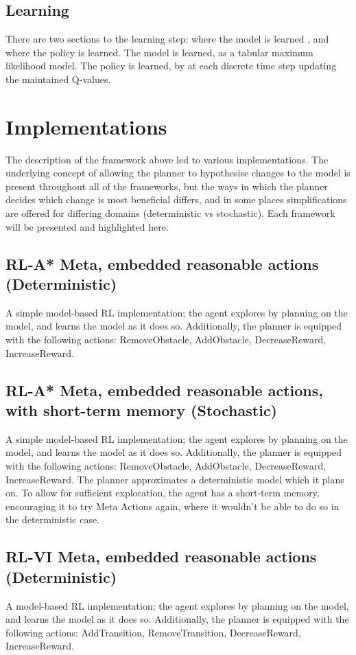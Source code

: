 \subsection{Learning}
There are two sections to the learning step: where the model is learned \cite{10.1145/122344.122377}, and  where the policy is learned. The model is learned, as a tabular maximum likelihood model. The policy is learned, by at each discrete time step  updating the maintained Q-values.

\section{Implementations}
The description of the framework above led to various implementations. The underlying concept of allowing the planner to hypothesise changes to the model is present throughout all of the frameworks, but the ways in which the planner decides which change is most beneficial differs, and in some places simplifications are offered for differing domains (deterministic vs stochastic). Each framework will be presented and highlighted here.
\subsection{RL-A* Meta, embedded reasonable actions (Deterministic)}
A simple model-based RL implementation; the agent explores by planning on the model, and learns the model as it does so.
Additionally, the planner is equipped with the following actions: RemoveObstacle, AddObstacle, DecreaseReward, IncreaseReward.
\subsection{RL-A* Meta, embedded reasonable actions, with short-term memory (Stochastic)}
A simple model-based RL implementation; the agent explores by planning on the model, and learns the model as it does so.
Additionally, the planner is equipped with the following actions: RemoveObstacle, AddObstacle, DecreaseReward, IncreaseReward. The planner approximates a deterministic model which it plans on. To allow for sufficient exploration, the agent has a short-term memory, encouraging it to try Meta Actions again, where it wouldn't be able to do so in the deterministic case.
\subsection{RL-VI Meta, embedded reasonable actions (Deterministic)}
A model-based RL implementation; the agent explores by planning on the model, and learns the model as it does so.
Additionally, the planner is equipped with the following actions: AddTransition, RemoveTransition, DecreaseReward, IncreaseReward.

